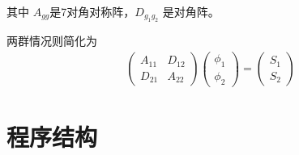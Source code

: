 其中 $A_{gg}$是7对角对称阵，$D_{g_1g_2}$ 是对角阵。

两群情况则简化为
\begin{align}
  \begin{pmatrix}
  A_{11} & D_{12} \\
  D_{21} & A_{22}
  \end{pmatrix}
  \begin{pmatrix}
  \phi_1 \\ \phi_2
  \end{pmatrix}
  =
  \begin{pmatrix}
  S_1 \\ S_2
  \end{pmatrix}
\end{align}

\TODO

\section{程序结构}
